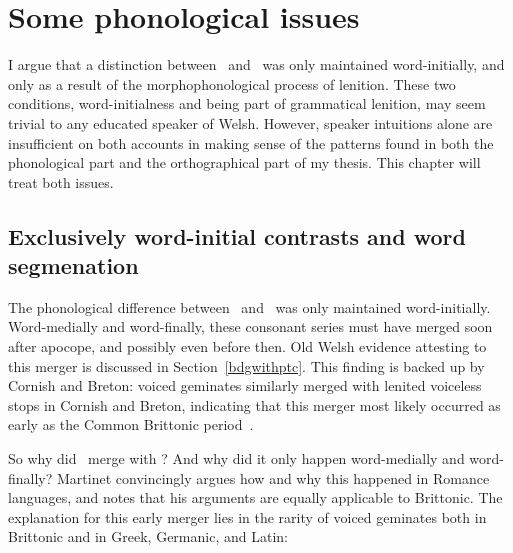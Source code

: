 \chapter{Some phonological issues}
I argue that a distinction between \lT\ and \xD\ was only maintained word-initially, and only as a result of the morphophonological process of lenition. These two conditions, word-initialness and being part of grammatical lenition, may seem trivial to any educated speaker of Welsh. However, speaker intuitions alone are insufficient on both accounts in making sense of the patterns found in both the phonological part and the orthographical part of my thesis. This chapter will treat both issues.

\section{Exclusively word-initial contrasts and word segmenation}
\label{sec:excl-word-init}
The phonological difference between \lT\ and \xD\ was only maintained word-initially. Word-medially and word-finally, these consonant series must have merged soon after apocope, and possibly even before then. Old Welsh evidence attesting to this merger is discussed in Section~\ref{bdgwithptc}. This finding is backed up by Cornish and Breton: voiced geminates similarly merged with lenited voiceless stops in Cornish and Breton, indicating that this merger most likely occurred as early as the Common Brittonic period~\textcite[31]{schrijver_old_2011}.


So why did \lT\ merge with \xD? And why did it only happen word-medially and word-finally? Martinet convincingly argues how and why this happened in Romance languages, and notes that his arguments are equally applicable to Brittonic. The explanation for this early merger lies in the rarity of voiced geminates both in Brittonic and in Greek, Germanic, and Latin: 

